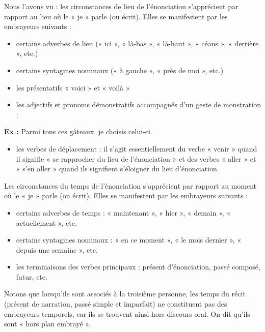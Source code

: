 Nous l’avons vu : les circonstances de lieu de l’énonciation s’apprécient par rapport au lieu où le « je » parle (ou écrit). Elles se manifestent par les embrayeurs suivants :
\begin{itemize}
\item certains adverbes de lieu (« ici », « là-bas », « là-haut », « céans », « derrière », etc.)
\item certains syntagmes nominaux (« à gauche », « près de moi », etc.)
\item les présentatifs « voici » et « voilà »
\item les adjectifs et pronoms démonstratifs accompagnés d’un geste de monstration :
\end{itemize}
\textbf{Ex :} Parmi tous ces gâteaux, je choisis celui-ci.
\begin{itemize}
\item les verbes de déplacement : il s’agit essentiellement du verbe « venir » quand il signifie « se rapprocher du lieu de l’énonciation » et des verbes « aller » et « s’en aller » quand ils signifient s’éloigner du lieu d’énonciation.
\end{itemize}

Les circonstances du temps de l’énonciation s’apprécient par rapport au moment où le « je » parle (ou écrit). Elles se manifestent par les embrayeurs suivants :
\begin{itemize}
\item certains adverbes de temps : « maintenant », « hier », « demain », « actuellement », etc.
\item certains syntagmes nominaux : « en ce moment », « le mois dernier », « depuis une semaine », etc.
\item les terminaisons des verbes principaux : présent d’énonciation, passé composé, futur, etc.
\end{itemize}
Notons que lorsqu’ils sont associés à la troisième personne, les temps du récit (présent de narration, passé simple et imparfait) ne constituent pas des embrayeurs temporels, car ils se trouvent ainsi hors discours oral. On dit qu’ils sont « hors plan embrayé ».

